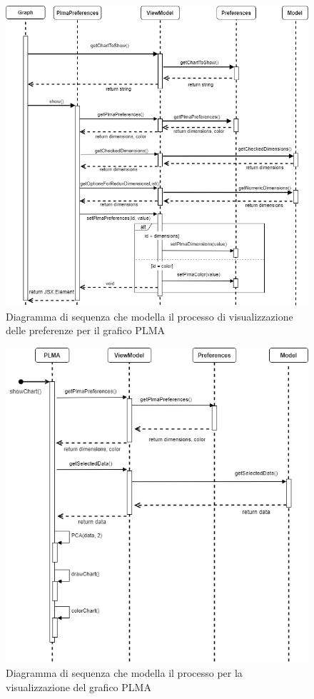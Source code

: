 \begin{figure}[hb]
\includegraphics[width=15.5cm]{Images/Allegato Tecnico-Sequenza-PLMApref}
\centering
\caption{Diagramma di sequenza che modella il processo di visualizzazione delle preferenze per il grafico PLMA}
\end{figure}
\newpage
\begin{figure}[hb]
\includegraphics[width=15.5cm]{Images/Allegato Tecnico-Sequenza-PLMA}
\centering
\caption{Diagramma di sequenza che modella il processo per la visualizzazione del grafico PLMA}
\end{figure}
\newpage

